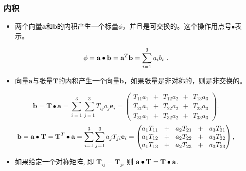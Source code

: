 \documentclass[LBMDerivation.tex]{subfiles}
\begin{document}
\subsubsection{内积}
%
%
\begin{itemize}
    \item 两个向量$\textbf{a}$和$\textbf{b}$的内积产生一个标量$\phi$，并且是可交换的。这个操作用点号$\bullet$表示。
\end{itemize}
%
%
\begin{equation}
 \phi = \textbf{a} \bullet \textbf{b} = \textbf{a} ^T \textbf{b} = \sum_{i=1}^{3} a_i b_i ~.
 \label{EQUATION::innerProductVV}
\end{equation}
%
%
%
\begin{itemize}
    \item  向量$\textbf{a}$与张量$\textbf{T}$的内积产生一个向量$\textbf{b}$，如果张量是非对称的，则是非交换的。
\end{itemize}
%
%
\begin{equation}
 \textbf{b} = \textbf{T} \bullet \textbf{a} =
 \sum_{i=1}^{3}\sum_{j=1}^{3} T_{ij} a_j   \textbf{e}_i
 =
  \left(
  \begin{matrix}
   T_{11} a_1 ~ ~ + ~ ~ T_{12} a_2 ~ ~ + ~ ~ T_{13} a_3 \\
   T_{21} a_1 ~ ~ + ~ ~ T_{22} a_2 ~ ~ + ~ ~ T_{23} a_3 \\
   T_{31} a_1 ~ ~ + ~ ~ T_{32} a_2 ~ ~ + ~ ~ T_{33} a_3
  \end{matrix}
  \right).
  \label{EQUATION::innerProductTV}
\end{equation}
%
%
\begin{equation}
 \textbf{b} = \textbf{a} \bullet \textbf{T}
 =
 \textbf{T} ^T \bullet \textbf{a}
 =
 \sum_{i=1}^{3}\sum_{j=1}^{3} a_j T_{ji}  \textbf{e}_i
 =
  \left(
  \begin{matrix}
   a_1 T_{11} ~ ~ + ~ ~ a_2 T_{21} ~ ~ + ~ ~ a_3 T_{31} \\
   a_1 T_{12} ~ ~ + ~ ~ a_2 T_{22} ~ ~ + ~ ~ a_3 T_{32} \\
   a_1 T_{13} ~ ~ + ~ ~ a_2 T_{23} ~ ~ + ~ ~ a_3 T_{33}
  \end{matrix}
  \right),
  \label{EQUATION::innerProductVT}
\end{equation}
%
%
\begin{itemize}
   \item[] 如果给定一个对称矩阵, 即 $\textbf{T}_{ij} = \textbf{T}_{ji}$
   则 $\textbf{a}\bullet\textbf{T} = \textbf{T} \bullet \textbf{a}$.
\end{itemize}
%
%
%
%
%
%
%
%
\end{document}
